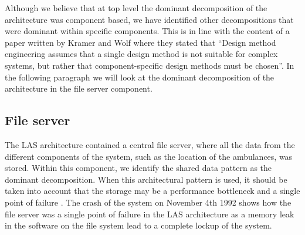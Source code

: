 Although we believe that at top level the dominant decomposition of the architecture was component based,
we have identified other decompositions that were dominant within specific components.
This is in line with the content of a paper written by Kramer and Wolf where they stated that
``Design method engineering assumes that a single design method is not suitable for complex systems,
but rather that component-specific design methods must be chosen''\autocite[26]{kramer1996succeedings}.
In the following paragraph we will look at the dominant decomposition of the architecture in the file server component.

\subsection*{File server}

The LAS architecture contained a central file server, where all the data from the different components of the system, such as the location of the ambulances, was stored.
Within this component, we identify the shared data pattern as the dominant decomposition.
When this architectural pattern is used, it should be taken into account that the storage may be a performance bottleneck and a single point of failure \autocite[chapter 13]{softArchitInPractice}.
The crash of the system on November 4th 1992 shows how the file server was a single point of failure in the LAS architecture as a memory leak in the software on the file system lead to a complete lockup of the system.
